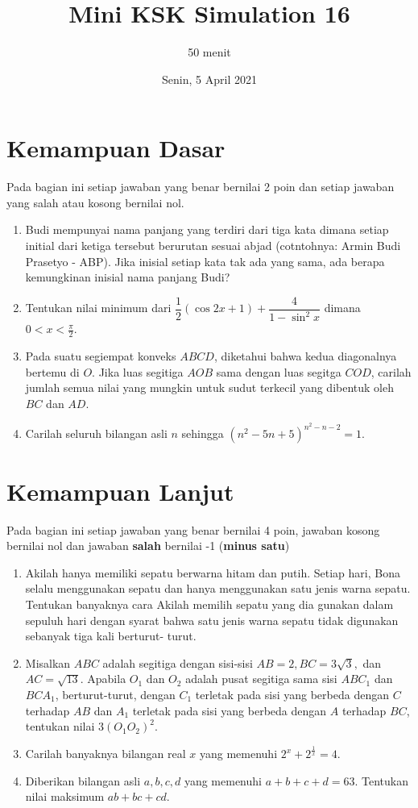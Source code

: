 \documentclass{article}
\title{Mini KSK Simulation 16}
\author{50 menit}
\date{Senin, 5 April 2021}
\begin{document}
	\maketitle
	
	\section{Kemampuan Dasar}
	Pada bagian ini setiap jawaban yang benar bernilai 2 poin dan setiap jawaban yang salah
	atau kosong bernilai nol.
	\begin{enumerate}
		\item Budi mempunyai nama panjang yang terdiri dari tiga kata dimana setiap initial dari ketiga tersebut berurutan sesuai abjad (cotntohnya: Armin Budi Prasetyo - ABP). Jika inisial setiap kata tak ada yang sama, ada berapa kemungkinan inisial nama panjang Budi?
		
		\item Tentukan nilai minimum dari $\dfrac12 (\cos 2x +1) + \dfrac{4}{1-\sin^2 x}$ dimana $0 < x < \frac{\pi}{2}$.
		
		\item Pada suatu segiempat konveks $ABCD$, diketahui bahwa kedua diagonalnya bertemu di $O$. Jika luas segitiga $AOB$ sama dengan luas segitga $COD$, carilah jumlah semua nilai yang mungkin untuk sudut terkecil yang dibentuk oleh $BC$ dan $AD$.
		
		\item Carilah seluruh bilangan asli $n$ sehingga $(n^2-5n+5)^{n^2-n-2}=1$.
	\end{enumerate}

\section{Kemampuan Lanjut}
Pada bagian ini setiap jawaban yang benar bernilai 4 poin, jawaban kosong bernilai nol
dan jawaban \textbf{salah} bernilai -1 (\textbf{minus satu})

\begin{enumerate}[resume]
		\item Akilah hanya memiliki sepatu berwarna hitam dan putih. Setiap hari, Bona selalu menggunakan sepatu dan hanya menggunakan satu jenis warna sepatu. Tentukan banyaknya cara Akilah memilih sepatu yang dia gunakan dalam sepuluh hari dengan syarat bahwa satu jenis warna sepatu tidak digunakan sebanyak tiga kali berturut-
		turut.
		
		\item Misalkan $ABC$ adalah segitiga dengan sisi-sisi $AB = 2, BC = 3\sqrt{3}, $ dan $ AC = \sqrt{13}$. Apabila $O_1$ dan $O_2$ adalah pusat segitiga sama sisi $ABC_1 $ dan $ BCA_1$, berturut-turut, dengan $C_1$ terletak pada sisi yang berbeda dengan $C$ terhadap $AB$ dan $A_1$ terletak pada sisi yang berbeda dengan $A$ terhadap $BC$, tentukan nilai $3(O_1O_2)^2$.
		
		\item Carilah banyaknya bilangan real $x$ yang memenuhi $2^x+2^{\frac{1}{x}}=4$.
		
		\item Diberikan bilangan asli $a,b,c,d$ yang memenuhi $a+b+c+d=63$. Tentukan nilai maksimum $ab+bc+cd$.
\end{enumerate}
\end{document}

